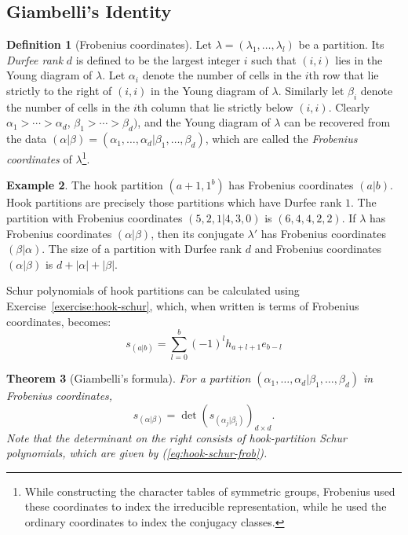 \documentclass[11pt]{amsproc}
\newtheorem{theorem}{Theorem}[subsection]
\theoremstyle{definition}
\newtheorem{definition}[theorem]{Definition}
\theoremstyle{example}
\newtheorem{example}[theorem]{Example}
\begin{document}
\subsection{Giambelli's Identity}
\label{sec:giambelli}
\begin{definition}
  [Frobenius coordinates]
  Let $\lambda=(\lambda_1,\dotsc,\lambda_l)$ be a partition.
  Its \emph{Durfee rank} $d$ is defined to be the largest integer $i$ such that $(i,i)$ lies in the Young diagram of $\lambda$.
  Let $\alpha_i$ denote the number of cells in the $i$th row that lie strictly to the right of $(i,i)$ in the Young diagram of $\lambda$.
  Similarly let $\beta_i$ denote the number of cells in the $i$th column that lie strictly below $(i,i)$.
  Clearly $\alpha_1>\dotsb>\alpha_d$, $\beta_1>\dotsb>\beta_d)$, and the Young diagram of $\lambda$ can be recovered from the data $(\alpha|\beta)=(\alpha_1,\dotsc,\alpha_d|\beta_1,\dotsc,\beta_d)$, which are called the \emph{Frobenius coordinates} of $\lambda$\footnote{While constructing the character tables of symmetric groups, Frobenius used these coordinates to index the irreducible representation, while he used the ordinary coordinates to index the conjugacy classes.}.
\end{definition}
\begin{example}
  The hook partition $(a+1,1^b)$ has Frobenius coordinates $(a|b)$.
  Hook partitions are precisely those partitions which have Durfee rank $1$.
  The partition with Frobenius coordinates $(5,2,1|4,3,0)$ is $(6,4,4,2,2)$.
  If $\lambda$ has Frobenius coordinates $(\alpha|\beta)$, then its conjugate $\lambda'$ has Frobenius coordinates $(\beta|\alpha)$.
  The size of a partition with Durfee rank $d$ and Frobenius coordinates $(\alpha|\beta)$ is $d+|\alpha|+|\beta|$. 
\end{example}
Schur polynomials of hook partitions can be calculated using Exercise~\ref{exercise:hook-schur}, which, when written is terms of Frobenius coordinates, becomes:
\begin{equation}
  \label{eq:hook-schur-frob}
  s_{(a|b)} = \sum_{l=0}^b (-1)^l h_{a+l+1}e_{b-l}
\end{equation}
\begin{theorem}
  [Giambelli's formula]
  For a partition $(\alpha_1,\dotsc,\alpha_d|\beta_1,\dotsc,\beta_d)$  in Frobenius coordinates,
  \begin{equation}
    \label{eq:giambelli}
    s_{(\alpha|\beta)} = \det(s_{(\alpha_j|\beta_i)})_{d\times d}.
  \end{equation}
  Note that the determinant on the right consists of hook-partition Schur polynomials, which are given by \textup{(\ref{eq:hook-schur-frob})}.
\end{theorem}
\end{document}
